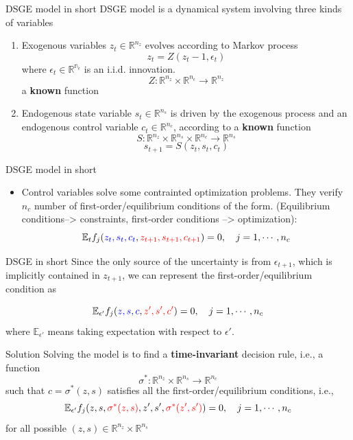 \documentclass[aspectratio=169]{beamer} %
\begin{document}
\begin{frame}{DSGE model in short}
DSGE model is a dynamical system involving three kinds of variables
\begin{enumerate}
    \item Exogenous variables $z_t\in\mathbb{R}^{n_z}$ evolves according to Markov process
    $$
    z_{t} = Z(z_t-1, \epsilon_t)
    $$
    where $\epsilon_t\in\mathbb{R^{n_\epsilon}}$ is an i.i.d. innovation.
    $$
    Z: \mathbb{R}^{n_z}\times \mathbb{R}^{n_\epsilon}\to \mathbb{R}^{n_z}
    $$
    a \textbf{known} function
    \item Endogenous state variable $s_t\in\mathbb{R}^{n_s}$ is driven by the exogenous process and an endogenous control variable $c_t\in\mathbb{R}^{n_c}$, according to a \textbf{known} function
    $$
    S: \mathbb{R}^{n_z} \times \mathbb{R}^{n_s} \times \mathbb{R}^{n_c}\to \mathbb{R}^{n_s}
    $$
    $$
    s_{t+1} = S(z_t, s_t,c_t)
    $$
\end{enumerate}


    
\end{frame}
\begin{frame}{DSGE model in short}
\begin{itemize}
    \item Control variables solve some contrainted optimization problems. They verify $n_c$ number of first-order/equilibrium conditions of the form. (Equilibrium conditions--> constraints, first-order conditions --> optimization):
    $$
    \mathbb{E}_t f_j(\textcolor{blue}{z_t, s_t, c_t}, \textcolor{red}{z_{t+1}, s_{t+1}, c_{t+1}})=0,\quad j=1,\cdots, n_c
    $$
\end{itemize}
    
\end{frame}

\begin{frame}{DSGE in short}
Since the only source of the uncertainty is from $\epsilon_{t+1}$, which is implicitly contained in $z_{t+1}$, we can represent the first-order/equilibrium condition as

$$
\mathbb{E}_{\epsilon'}f_j(\textcolor{blue}{z, s, c}, \textcolor{red}{z', s', c'})=0,\quad j=1,\cdots, n_c
$$
where $\mathbb{E}_{\epsilon'}$ means taking expectation with respect to $\epsilon'$.
    
\end{frame}

\begin{frame}{Solution}
    Solving the model is to find a \textbf{time-invariant} decision rule, i.e., a function
    $$
    \sigma^*: \mathbb{R}^{n_z}\times \mathbb{R}^{n_s} \to \mathbb{R}^{n_c}
    $$
    such that $c=\sigma^*(z,s)$ satisfies all the first-order/equilibrium conditions, i.e.,
    $$
    \mathbb{E}_{\epsilon'}f_j(z, s, \textcolor{red}{\sigma^*(z,s)}, z', s', \textcolor{red}{\sigma^*(z',s')})=0,\quad j=1,\cdots, n_c
    $$
    for all possible $(z,s)\in\mathbb{R}^{n_z}\times\mathbb{R}^{n_s}$
\end{frame}
\end{document}

